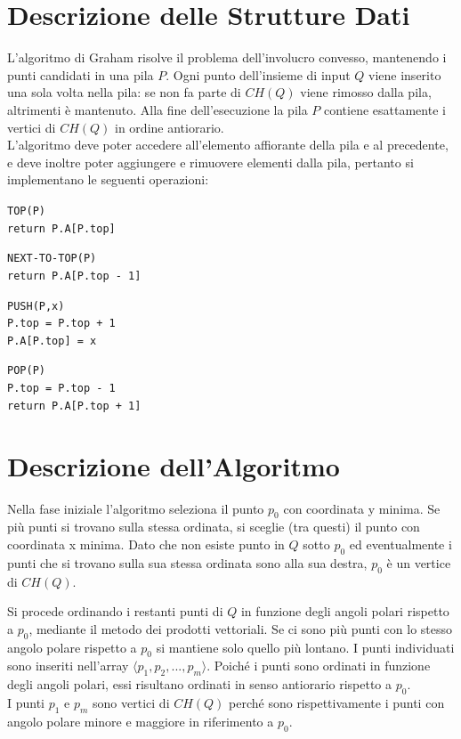 \documentclass[12pt,a4paper]{report}
\begin{document}
\section{Descrizione delle Strutture Dati}
L'algoritmo di Graham risolve il problema dell'involucro convesso, mantenendo i punti candidati in una pila $P$. Ogni punto dell'insieme di input $Q$ viene inserito una sola volta nella pila: se non fa parte di $CH(Q)$ viene rimosso dalla pila, altrimenti è mantenuto.
Alla fine dell'esecuzione la pila $P$ contiene esattamente i vertici di $CH(Q)$ in ordine antiorario.\\
L'algoritmo deve poter accedere all'elemento affiorante della pila e al precedente, e deve inoltre poter aggiungere e rimuovere elementi dalla pila, pertanto si implementano le seguenti operazioni:

\vspace{0.5cm}

\noindent \texttt{TOP(P)\\
return P.A[P.top]}

\vspace{0.4cm}

\noindent \texttt{NEXT-TO-TOP(P)\\
return P.A[P.top - 1]}

\vspace{0.4cm}

\noindent \texttt{PUSH(P,x)\\
P.top = P.top + 1\\
P.A[P.top] = x}

\vspace{0.4cm}

\noindent \texttt{POP(P)\\
P.top = P.top - 1\\
return P.A[P.top + 1]}

\section{Descrizione dell'Algoritmo}
Nella fase iniziale l'algoritmo seleziona il punto $p_0$ con coordinata y minima. Se più punti si trovano sulla stessa ordinata, si sceglie (tra questi) il punto con coordinata x minima. Dato che non esiste punto in $Q$ sotto $p_0$ ed eventualmente i punti che si trovano sulla sua stessa ordinata sono alla sua destra, $p_0$ è un vertice di $CH(Q)$.

\vspace{0.5cm}

Si procede ordinando i restanti punti di $Q$ in funzione degli angoli polari rispetto a $p_0$, mediante il metodo dei prodotti vettoriali. Se ci sono più punti con lo stesso angolo polare rispetto a $p_0$ si mantiene solo quello più lontano. I punti individuati sono inseriti nell'array $\langle p_1, p_2, ..., p_m \rangle$. Poiché i punti sono ordinati in funzione degli angoli polari, essi risultano ordinati in senso antiorario rispetto a $p_0$.\\
I punti $p_1$ e $p_m$ sono vertici di $CH(Q)$ perché sono rispettivamente i punti con angolo polare minore e maggiore in riferimento a $p_0$.
\end{document}
